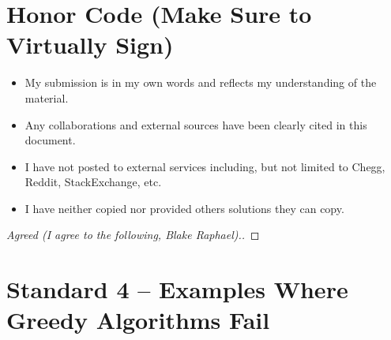 \documentclass[11pt]{article}
\theoremstyle{definition}
\theoremstyle{definition}
\newtheorem{required}{Problem}
\theoremstyle{definition}
\begin{document}
\section{Honor Code (Make Sure to Virtually Sign)} \label{HonorCode}

\begin{itemize}
\item My submission is in my own words and reflects my understanding of the material.
\item Any collaborations and external sources have been clearly cited in this document.
\item I have not posted to external services including, but not limited to Chegg, Reddit, StackExchange, etc.
\item I have neither copied nor provided others solutions they can copy.
\end{itemize}


\begin{proof}[Agreed (I agree to the following, Blake Raphael).]
\end{proof}

\newpage
\section{Standard 4 -- Examples Where Greedy Algorithms Fail}

\setcounter{subsection}{2}
\end{document}
